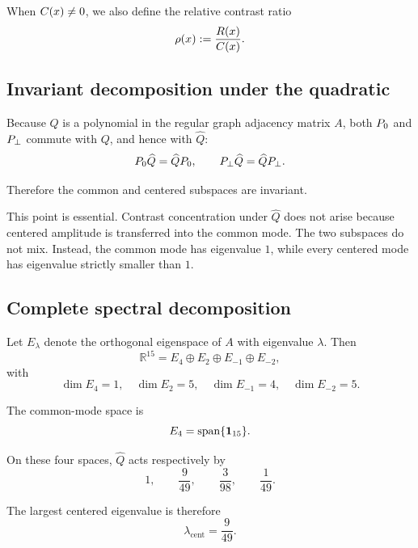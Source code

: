 When \(C(x)\neq0\), we also define the relative contrast ratio
\[
\rho(x)
:=
\frac{R(x)}{C(x)}.
\]

\subsection{Invariant decomposition under the quadratic}

Because \(Q\) is a polynomial in the regular graph adjacency matrix
\(A\), both \(P_{0}\) and \(P_{\perp}\) commute with \(Q\), and hence
with \(\widehat{Q}\):
\[
P_{0}\widehat{Q}
=
\widehat{Q}P_{0},
\qquad
P_{\perp}\widehat{Q}
=
\widehat{Q}P_{\perp}.
\]

Therefore the common and centered subspaces are invariant.

This point is essential.  Contrast concentration under
\(\widehat{Q}\) does not arise because centered amplitude is
transferred into the common mode.  The two subspaces do not mix.
Instead, the common mode has eigenvalue \(1\), while every centered
mode has eigenvalue strictly smaller than \(1\).

\subsection{Complete spectral decomposition}

Let \(E_\lambda\) denote the orthogonal eigenspace of \(A\) with
eigenvalue \(\lambda\).  Then
\[
\mathbb R^{15}
=
E_4
\oplus
E_2
\oplus
E_{-1}
\oplus
E_{-2},
\]
with
\[
\dim E_4=1,\quad
\dim E_2=5,\quad
\dim E_{-1}=4,\quad
\dim E_{-2}=5.
\]

The common-mode space is
\[
E_4=\operatorname{span}\{\mathbf{1}_{15}\}.
\]

On these four spaces, \(\widehat{Q}\) acts respectively by
\[
1,\qquad
\frac{9}{49},\qquad
\frac{3}{98},\qquad
\frac{1}{49}.
\]

The largest centered eigenvalue is therefore
\[
\lambda_{\mathrm{cent}}
=
\frac{9}{49}.
\]
